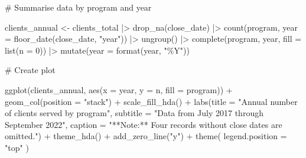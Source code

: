\documentclass[
  letterpaper,
  DIV=11,
  numbers=noendperiod]{scrartcl}
\newenvironment{Shaded}{\begin{snugshade}}{\end{snugshade}}
\newcommand{\AttributeTok}[1]{\textcolor[rgb]{0.40,0.45,0.13}{#1}}
\newcommand{\CommentTok}[1]{\textcolor[rgb]{0.37,0.37,0.37}{#1}}
\newcommand{\DecValTok}[1]{\textcolor[rgb]{0.68,0.00,0.00}{#1}}
\newcommand{\FunctionTok}[1]{\textcolor[rgb]{0.28,0.35,0.67}{#1}}
\newcommand{\NormalTok}[1]{\textcolor[rgb]{0.00,0.23,0.31}{#1}}
\newcommand{\OtherTok}[1]{\textcolor[rgb]{0.00,0.23,0.31}{#1}}
\newcommand{\SpecialCharTok}[1]{\textcolor[rgb]{0.37,0.37,0.37}{#1}}
\newcommand{\StringTok}[1]{\textcolor[rgb]{0.13,0.47,0.30}{#1}}
\begin{document}
\begin{Shaded}
\begin{Highlighting}[]
\CommentTok{\# Summarise data by program and year}

\NormalTok{clients\_annual }\OtherTok{\textless{}{-}}\NormalTok{ clients\_total }\SpecialCharTok{|\textgreater{}} 
  \FunctionTok{drop\_na}\NormalTok{(close\_date) }\SpecialCharTok{|\textgreater{}}     
  \FunctionTok{count}\NormalTok{(program, }\AttributeTok{year =} \FunctionTok{floor\_date}\NormalTok{(close\_date, }\StringTok{"year"}\NormalTok{)) }\SpecialCharTok{|\textgreater{}} 
  \FunctionTok{ungroup}\NormalTok{() }\SpecialCharTok{|\textgreater{}} 
  \FunctionTok{complete}\NormalTok{(program, year, }\AttributeTok{fill =} \FunctionTok{list}\NormalTok{(}\AttributeTok{n =} \DecValTok{0}\NormalTok{)) }\SpecialCharTok{|\textgreater{}} 
  \FunctionTok{mutate}\NormalTok{(}\AttributeTok{year =} \FunctionTok{format}\NormalTok{(year, }\StringTok{"\%Y"}\NormalTok{))}

\CommentTok{\# Create plot}

\FunctionTok{ggplot}\NormalTok{(clients\_annual, }\FunctionTok{aes}\NormalTok{(}\AttributeTok{x =}\NormalTok{ year, }\AttributeTok{y =}\NormalTok{ n, }\AttributeTok{fill =}\NormalTok{ program)) }\SpecialCharTok{+}
  \FunctionTok{geom\_col}\NormalTok{(}\AttributeTok{position =} \StringTok{"stack"}\NormalTok{) }\SpecialCharTok{+}
  \FunctionTok{scale\_fill\_hda}\NormalTok{() }\SpecialCharTok{+}
  \FunctionTok{labs}\NormalTok{(}\AttributeTok{title =} \StringTok{"Annual number of clients served by program"}\NormalTok{,}
       \AttributeTok{subtitle =} \StringTok{"Data from July 2017 through September 2022"}\NormalTok{,}
       \AttributeTok{caption =} \StringTok{"**Note:** Four records without close dates are omitted."}\NormalTok{) }\SpecialCharTok{+}
  \FunctionTok{theme\_hda}\NormalTok{() }\SpecialCharTok{+}
  \FunctionTok{add\_zero\_line}\NormalTok{(}\StringTok{"y"}\NormalTok{) }\SpecialCharTok{+}
  \FunctionTok{theme}\NormalTok{(}
    \AttributeTok{legend.position =} \StringTok{"top"}
\NormalTok{  )}
\end{Highlighting}
\end{Shaded}
\end{document}
